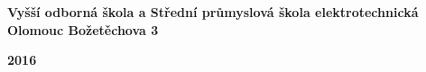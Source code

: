\begin{titlepage}
	\centering

	\begin{figure}[H]
		\centering
		
	\end{figure}

	{\LARGE \bfseries Vyšší odborná škola a Střední průmyslová škola elektrotechnická Olomouc Božetěchova 3}

	\vspace*{\fill}


	\vfill

	{\LARGE \bfseries 2016 \hfill \theauthor}
\end{titlepage}